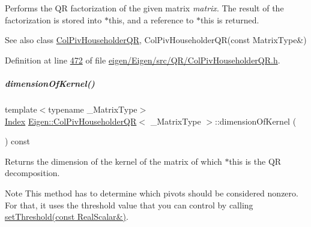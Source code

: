 Performs the QR factorization of the given matrix {\itshape matrix}. The result of the factorization is stored into {\ttfamily $\ast$this}, and a reference to {\ttfamily $\ast$this} is returned.

\begin{DoxySeeAlso}{See also}
class \hyperlink{group___q_r___module_class_eigen_1_1_col_piv_householder_q_r}{Col\+Piv\+Householder\+QR}, Col\+Piv\+Householder\+Q\+R(const Matrix\+Type\&) 
\end{DoxySeeAlso}


Definition at line \hyperlink{eigen_2_eigen_2src_2_q_r_2_col_piv_householder_q_r_8h_source_l00472}{472} of file \hyperlink{eigen_2_eigen_2src_2_q_r_2_col_piv_householder_q_r_8h_source}{eigen/\+Eigen/src/\+Q\+R/\+Col\+Piv\+Householder\+Q\+R.\+h}.

\mbox{\label{group___q_r___module_a7c9294565d179226133770160b827be1}} 
\subparagraph{\texorpdfstring{dimension\+Of\+Kernel()}{dimensionOfKernel()}\hspace{0.1cm}{\footnotesize\ttfamily [1/2]}}
{\footnotesize\ttfamily template$<$typename \+\_\+\+Matrix\+Type$>$ \\
\hyperlink{namespace_eigen_a62e77e0933482dafde8fe197d9a2cfde}{Index} \hyperlink{group___q_r___module_class_eigen_1_1_col_piv_householder_q_r}{Eigen\+::\+Col\+Piv\+Householder\+QR}$<$ \+\_\+\+Matrix\+Type $>$\+::dimension\+Of\+Kernel (\begin{DoxyParamCaption}{ }\end{DoxyParamCaption}) const\hspace{0.3cm}{\ttfamily [inline]}}

\begin{DoxyReturn}{Returns}
the dimension of the kernel of the matrix of which $\ast$this is the QR decomposition.
\end{DoxyReturn}
\begin{DoxyNote}{Note}
This method has to determine which pivots should be considered nonzero. For that, it uses the threshold value that you can control by calling \hyperlink{group___q_r___module_ae712cdc9f0e521cfc8061bee58ff55ee}{set\+Threshold(const Real\+Scalar\&)}. 
\end{DoxyNote}


